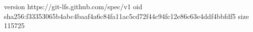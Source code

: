 version https://git-lfs.github.com/spec/v1
oid sha256:f33353065b4abc4baaf4a6c84fa11ac5cd72f44c94fc12e86c63e4ddf4bbfdf5
size 115725
